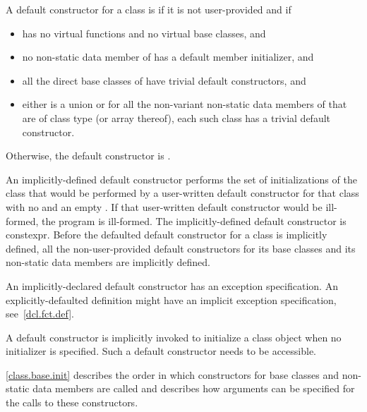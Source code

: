 \pnum
A default constructor for a class  is
if it is not user-provided and if
\begin{itemize}
\item
{} has no virtual functions and no virtual base
classes, and

\item no non-static data member of  has
a default member initializer, and

\item
all the direct base classes of  have trivial default constructors, and

\item
either  is a union or
for all the non-variant non-static data members of  that are of class
type (or array thereof), each such class has a trivial default constructor.
\end{itemize}

Otherwise, the default constructor is
.

\pnum
An implicitly-defined default constructor performs the set of
initializations of the class that would be performed by a user-written default
constructor for that class with no
 and an empty
.
If that user-written default constructor would be ill-formed,
the program is ill-formed.
The implicitly-defined default constructor is constexpr.
Before the defaulted default constructor for a class is
implicitly defined,
all the non-user-provided default constructors for its base classes and
its non-static data members are implicitly defined.
\begin{note}
An implicitly-declared default constructor has an
exception specification.
An explicitly-defaulted definition might have an
implicit exception specification, see~\ref{dcl.fct.def}.
\end{note}

\pnum
\begin{note}
%
A default constructor is implicitly invoked to initialize
a class object when no initializer is specified.
Such a default constructor needs to be accessible.
\end{note}

\pnum
\begin{note}
%
%
\ref{class.base.init} describes the order in which constructors for base
classes and non-static data members are called and
describes how arguments can be specified for the calls to these constructors.
\end{note}

